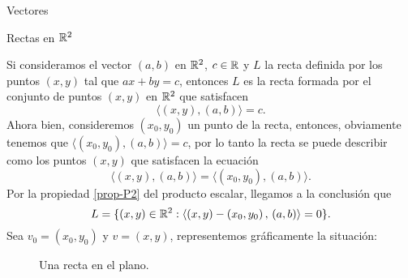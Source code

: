 \begin{chapter}{Vectores}
\begin{section}{Rectas en $\mathbb R^2$}
    \begin{observacion*}
        Si  consideramos  el vector $(a,b)$ en $\mathbb R^2$, $c \in \mathbb R$ y $L$ la recta definida por los puntos $(x,y)$ tal que $ax +by =c$,  entonces $L$ es la recta formada por el conjunto de puntos $(x,y)$ en $\mathbb R^2$ que satisfacen 
        \begin{equation*}
            \langle (x,y), (a,b) \rangle = c.
        \end{equation*}
    Ahora bien, consideremos $(x_0,y_0)$ un punto de la recta, entonces,  obviamente tenemos que $\langle (x_0,y_0), (a,b) \rangle = c$, por lo tanto la recta se puede describir como los puntos $(x,y)$ que satisfacen la ecuación 
    \begin{equation*}
    \langle (x,y), (a,b) \rangle = \langle (x_0,y_0), (a,b) \rangle.
    \end{equation*}	
    Por la propiedad \ref{prop-P2} del producto escalar, llegamos a la conclusión que 
    \begin{equation*}
    L = \{(x,y) \in \mathbb R^2: \langle (x,y)-(x_0,y_0)\,,\, (a,b) \rangle = 0 \}.
    \end{equation*}
    Sea $v_0 =(x_0,y_0)$ y $v =(x,y)$,   representemos gráficamente la situación: 
    \begin{figure}[h]
    	\centering
        \caption{Una recta en el plano.}
        \label{fig-recta-parametrica}
    \end{figure} 



\end{observacion*}
\end{section}
\end{chapter}
